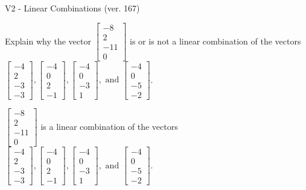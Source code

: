 \begin{exercise}
  \begin{exerciseTitle}V2 - Linear Combinations (ver. 167)\end{exerciseTitle}
  \begin{exerciseStatement}
    Explain why the vector \(\left[\begin{array}{c}
-8 \\
2 \\
-11 \\
0
\end{array}\right]\)  is or is not a linear 
	combination of the vectors \(\left[\begin{array}{c}
-4 \\
2 \\
-3 \\
-3
\end{array}\right] , \left[\begin{array}{c}
-4 \\
0 \\
2 \\
-1
\end{array}\right] , \left[\begin{array}{c}
-4 \\
0 \\
-3 \\
1
\end{array}\right] , \text{ and } \left[\begin{array}{c}
-4 \\
0 \\
-5 \\
-2
\end{array}\right]\).
	


  \end{exerciseStatement}
  \begin{exerciseAnswer}
   \(\left[\begin{array}{c}
-8 \\
2 \\
-11 \\
0
\end{array}\right]\) 
  	 is  
	a linear combination of the vectors \(\left[\begin{array}{c}
-4 \\
2 \\
-3 \\
-3
\end{array}\right] , \left[\begin{array}{c}
-4 \\
0 \\
2 \\
-1
\end{array}\right] , \left[\begin{array}{c}
-4 \\
0 \\
-3 \\
1
\end{array}\right] , \text{ and } \left[\begin{array}{c}
-4 \\
0 \\
-5 \\
-2
\end{array}\right]\).


\end{exerciseAnswer}
\end{exercise}
